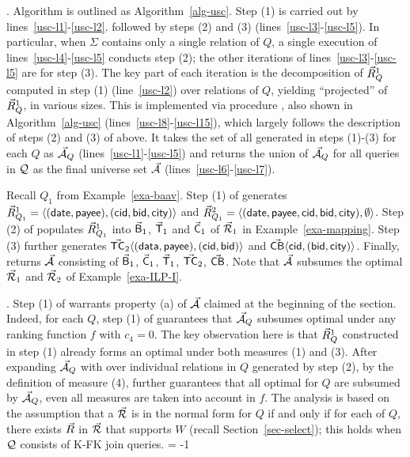 .
Algorithm \usc is outlined as Algorithm~\ref{alg-usc}.
Step (1) is carried out by lines~\ref{usc-l1}-\ref{usc-l2}.
followed by
  steps (2) and (3) (lines~\ref{usc-l3}-\ref{usc-l5}).
In particular, when $\Sigma$
contains only a single relation of $Q$, a single execution
  of lines~\ref{usc-l4}-\ref{usc-l5} conducts step (2);
the other iterations of lines~\ref{usc-l3}-\ref{usc-l5} are for 
step (3). The key part of each iteration is the decomposition of
$\vec{R}_{Q}^{1}$ computed in step (1) (line~\ref{usc-l2}) over
relations of $Q$, yielding ``projected'' \bss of
$\vec{R}_{Q}^{1}$, in various sizes. This is implemented via
procedure \decompose, also shown
in Algorithm~\ref{alg-usc} (lines~\ref{usc-l8}-\ref{usc-l15}), which
largely follows the description of steps (2) and (3) of above.
It takes the set of all \bss generated in steps (1)-(3) for
each $Q$ as $\vec{{\mathcal A}}_{Q}$ (lines~\ref{usc-l1}-\ref{usc-l5}) and
returns the union of $\vec{{\mathcal A}}_{Q}$ for all queries in $\mathcal Q$ as the
final universe set $\vec{{\mathcal A}}$ (lines~\ref{usc-l6}-\ref{usc-l7}).


\begin{example}\label{exa-usc}
Recall $Q_{1}$ from Example~\ref{exa-baav}.
Step (1) of \usc generates $\vec{R}_{Q_{1}}^{1} \allowbreak =\allowbreak
\langle (\protect\mathsf{date}, \allowbreak \protect\mathsf{payee}),\allowbreak (\protect\mathsf{cid}, \allowbreak \protect\mathsf{bid},
  \allowbreak \protect\mathsf{city})\rangle$ and 
$\vec{R}_{Q_{1}}^{2} = \langle (\protect\mathsf{date}, \allowbreak \protect\mathsf{payee},
  \protect\mathsf{cid}, \allowbreak \protect\mathsf{bid}, \allowbreak \protect\mathsf{city}),\allowbreak \emptyset\rangle$. 
Step (2) of \usc populates $\vec{R}_{Q_{1}}^{1}$ into 
$\vec{\protect\mathsf{B}}_{1}$, $\vec{\protect\mathsf{T}}_{1}$ and $\vec{\protect\mathsf{C}}_{1}$ of
$\vec{{\mathcal R}}_{1}$ in Example~\ref{exa-mapping}.
Step (3) further generates $\vec{\protect\mathsf{TC}}_{2}\langle (\protect\mathsf{data},\allowbreak
  \protect\mathsf{payee}),\allowbreak (\protect\mathsf{cid},\allowbreak \protect\mathsf{bid})\rangle$ and 
$\vec{\protect\mathsf{CB}}\langle \protect\mathsf{cid},\allowbreak (\protect\mathsf{bid},\allowbreak \protect\mathsf{city})\rangle$.
Finally, \opts returns $\vec{{\mathcal A}}$ consisting of 
$\vec{\protect\mathsf{B}}_{1}$, $\vec{\protect\mathsf{C}}_{1}$, $\vec{\protect\mathsf{T}}_{1}$,
$\vec{\protect\mathsf{TC}}_{2}$, $\vec{\protect\mathsf{CB}}$.
Note that $\vec{{\mathcal A}}$ subsumes the optimal \bds $\vec{{\mathcal R}}_{1}$ and
$\vec{{\mathcal R}}_{2}$ of Example~\ref{exa-ILP-I}.
\end{example}

\vspace{-0.7ex}


.
Step (1) of \usc warrants property (a) of $\vec{{\mathcal A}}$ claimed at
the beginning of the section. Indeed, for each $Q$, step (1) of
\usc guarantees that $\vec{{\mathcal A}}_{Q}$ subsumes optimal \bdss under
any ranking function $f$ with $c_{4} = 0$. The key observation
here is that $\vec{R}_{Q}^{1}$ constructed in step (1) already forms an
optimal \bds under both measures (1) and (3).
After expanding $\vec{{\mathcal A}}_{Q}$ with \bss over individual relations
in $Q$ generated by step (2), by the definition of measure (4),
\usc further guarantees that all optimal \bdss for $Q$ are subsumed by
$\vec{{\mathcal A}}_{Q}$, even all measures are taken into account in $f$.
The analysis is based on the assumption that a \bds $\vec{{\mathcal R}}$ is
in the normal form for $Q$ if and only if for each \qcs of $Q$, there
exists \bs $\vec{R}$ in $\vec{{\mathcal R}}$ that supports $W$ (recall
Section~\ref{sec-select}); this holds when $\mathcal Q$
consists of K-FK join \SPC queries.
\looseness = -1

